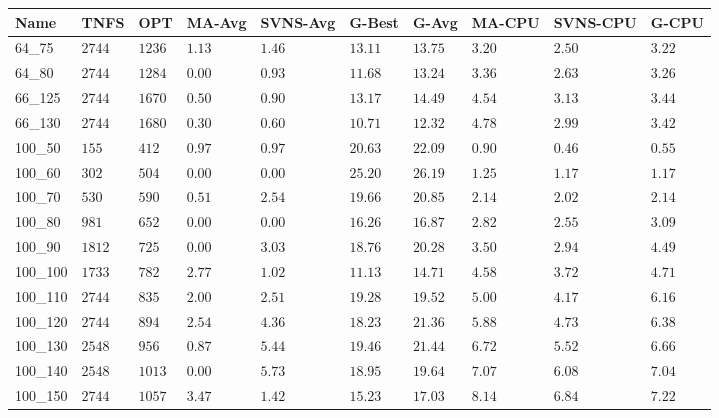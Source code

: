 \begin{center}
    \begin{table}[]
    \centering
    \begin{adjustwidth}{-0.4in}{-1in}
    \begin{tabular}{|lll|l|l|ll|lll|}
\hline
Name     & TNFS        & OPT    & MA-Avg & SVNS-Avg & G-Best & G-Avg & MA-CPU & SVNS-CPU & G-CPU \\
\hline
64\_75   & $2744   $   & $1236$ & $1.13$ & $1.46$   & $13.11$    & $13.75$   & $3.20 $& $2.50$   & $3.22 $ \\
64\_80   & $2744   $   & $1284$ & $\bm{0.00}$ & $0.93$   & $11.68$    & $13.24$   & $3.36 $& $2.63$   & $3.26 $ \\
\hline
66\_125  & $2744   $   & $1670$ & $0.50$ & $0.90$   & $13.17$    & $14.49$   & $4.54 $& $3.13$   & $3.44 $ \\
66\_130  & $2744   $   & $1680$ & $0.30$ & $0.60$   & $10.71$    & $12.32$   & $4.78 $& $2.99$   & $3.42 $ \\
\hline
100\_50  & $155    $   & $412 $ & $0.97$ & $0.97$   & $20.63$    & $22.09$   & $0.90 $& $0.46$   & $0.55 $ \\
100\_60  & $302    $   & $504 $ & $\bm{0.00}$ & $\bm{0.00}$   & $25.20$    & $26.19$   & $1.25 $& $1.17$   & $1.17 $ \\
100\_70  & $530    $   & $590 $ & $0.51$ & $2.54$   & $19.66$    & $20.85$   & $2.14 $& $2.02$   & $2.14 $ \\
100\_80  & $981    $   & $652 $ & $\bm{0.00}$ & $\bm{0.00}$   & $16.26$    & $16.87$   & $2.82 $& $2.55$   & $3.09 $ \\
100\_90  & $1812   $   & $725 $ & $\bm{0.00}$ & $3.03$   & $18.76$    & $20.28$   & $3.50 $& $2.94$   & $4.49 $ \\
100\_100 & $1733   $   & $782 $ & $2.77$ & $1.02$   & $11.13$    & $14.71$   & $4.58 $& $3.72$   & $4.71 $ \\
100\_110 & $2744   $   & $835 $ & $2.00$ & $2.51$   & $19.28$    & $19.52$   & $5.00 $& $4.17$   & $6.16 $ \\
100\_120 & $2744   $   & $894 $ & $2.54$ & $4.36$   & $18.23$    & $21.36$   & $5.88 $& $4.73$   & $6.38 $ \\
100\_130 & $2548   $   & $956 $ & $0.87$ & $5.44$   & $19.46$    & $21.44$   & $6.72 $& $5.52$   & $6.66 $ \\
100\_140 & $2548   $   & $1013$ & $\bm{0.00}$ & $5.73$   & $18.95$    & $19.64$   & $7.07 $& $6.08$   & $7.04 $ \\
100\_150 & $2744   $   & $1057$ & $3.47$ & $1.42$   & $15.23$    & $17.03$   & $8.14 $& $6.84$   & $7.22 $ \\

\end{tabular}
\end{adjustwidth}
\end{table}
\end{center}
